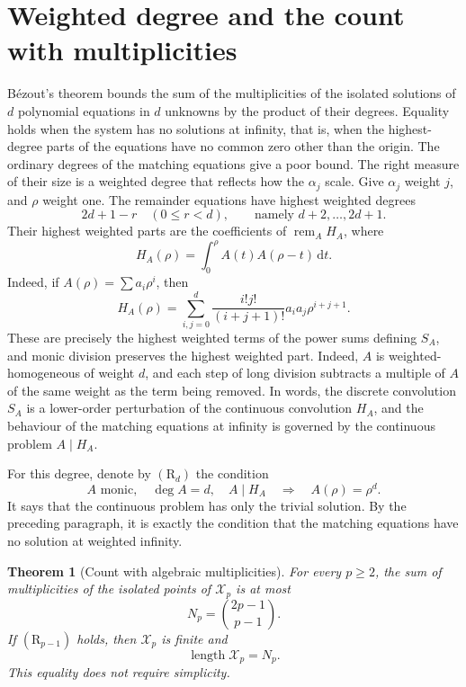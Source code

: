 \documentclass[11pt]{article}
\newtheorem{theorem}{Theorem}[section]
\newcommand{\remA}{\operatorname{rem}_{A}}
\newcommand{\len}{\operatorname{length}}
\newcommand{\Xp}{\mathcal X_p}
\newcommand{\dd}{\,\mathrm d}
\numberwithin{equation}{section}
\begin{document}
\section{Weighted degree and the count with multiplicities}
\label{sec:weighted}

B\'ezout's theorem bounds the sum of the multiplicities of the
isolated solutions of \(d\) polynomial equations in \(d\) unknowns
by the product of their degrees. Equality holds when the system has
no solutions at infinity, that is, when the highest-degree parts of
the equations have no common zero other than the origin. The ordinary
degrees of the matching equations give a poor bound. The right
measure of their size is a weighted degree that reflects how the
\(\alpha_j\) scale.
Give \(\alpha_j\) weight \(j\), and \(\rho\) weight one.
The remainder equations have highest weighted degrees
\begin{equation}\label{eq:weights}
 2d+1-r\quad(0\le r<d),\qquad\text{namely }d+2,\ldots,2d+1.
\end{equation}
Their highest weighted parts are the coefficients of
\(\remA H_A\), where
\begin{equation}\label{eq:continuous}
 H_A(\rho)=\int_0^\rho A(t)A(\rho-t)\dd t.
\end{equation}
Indeed, if \(A(\rho)=\sum a_i\rho^i\), then
\[
 H_A(\rho)=\sum_{i,j=0}^{d}
     \frac{i!j!}{(i+j+1)!}a_ia_j\rho^{i+j+1}.
\]
These are precisely the highest weighted terms of the power sums
defining \(S_A\), and monic division preserves the highest weighted
part. Indeed, \(A\) is weighted-homogeneous of weight \(d\), and each
step of long division subtracts a multiple of \(A\) of the same
weight as the term being removed.
In words, the discrete convolution \(S_A\) is a lower-order
perturbation of the continuous convolution \(H_A\), and the behaviour
of the matching equations at infinity is governed by the continuous
problem \(A\mid H_A\).

For this degree, denote by \((\mathrm{R}_d)\) the condition
\begin{equation}\label{eq:rigidity}
 A\text{ monic},\quad\deg A=d,\quad A\mid H_A
 \quad\Longrightarrow\quad A(\rho)=\rho^d.
\end{equation}
It says that the continuous problem has only the trivial solution.
By the preceding paragraph, it is exactly the condition that the
matching equations have no solution at weighted infinity.

\begin{theorem}[Count with algebraic multiplicities]\label{thm:length}
For every \(p\ge2\), the sum of multiplicities of the isolated points
of \(\Xp\) is at most
\[
 N_p=\binom{2p-1}{p-1}.
\]
If \((\mathrm R_{p-1})\) holds, then \(\Xp\) is finite and
\begin{equation}\label{eq:length}
 \len\Xp=N_p.
\end{equation}
This equality does not require simplicity.
\end{theorem}
\end{document}
